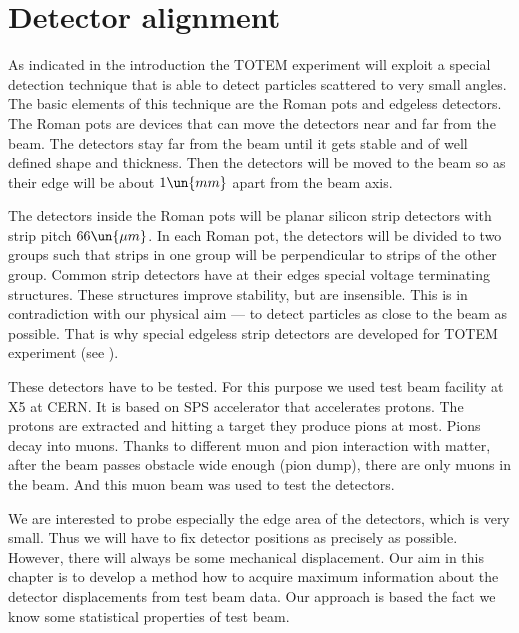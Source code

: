 \def\D{{\cal D}}
\def\fg{Fig.}
\def\fgs{Figs.}
\def\Fg{Fig.}
\def\Fgs{Figs.}
\def\equ{Eq.}
\def\equs{Eqs.}
\def\Equ{Eq.}
\def\Equs{Eqs.}


\chapter{Detector alignment}

\vfil
As indicated in the introduction the TOTEM experiment will exploit a special detection technique that is able to detect particles scattered to very small angles. The basic elements of this technique are the Roman pots and edgeless detectors. The Roman pots are devices that can move the detectors near and far from the beam. The detectors stay far from the beam until it gets stable and of well defined shape and thickness. Then the detectors will be moved to the beam so as their edge will be about $1\un{mm}$ apart from the beam axis.

The detectors inside the Roman pots will be planar silicon strip detectors with strip pitch $66\un{\mu m}$. In each Roman pot, the detectors will be divided to two groups such that strips in one group will be perpendicular to strips of the other group. Common strip detectors have at their edges special voltage terminating structures. These structures improve stability, but are insensible. This is in contradiction with our physical aim --- to detect particles as close to the beam as possible. That is why special edgeless strip detectors are developed for TOTEM experiment (see ).

These detectors have to be tested. For this purpose we used test beam facility at X5 at CERN. It is based on SPS accelerator that accelerates protons. The protons are extracted and hitting a target they produce pions at most. Pions decay into muons. Thanks to different muon and pion interaction
with matter, after the beam passes obstacle wide enough (pion dump), there are only muons in the beam. And this muon beam was used to test the detectors.

We are interested to probe especially the edge area of the detectors, which is very small. Thus we will have to fix detector positions as precisely as possible. However, there will always be some mechanical displacement. Our aim in this chapter is to develop a method how to acquire maximum information about the detector displacements from test beam data. Our approach is based the fact we know some statistical properties of test beam.





